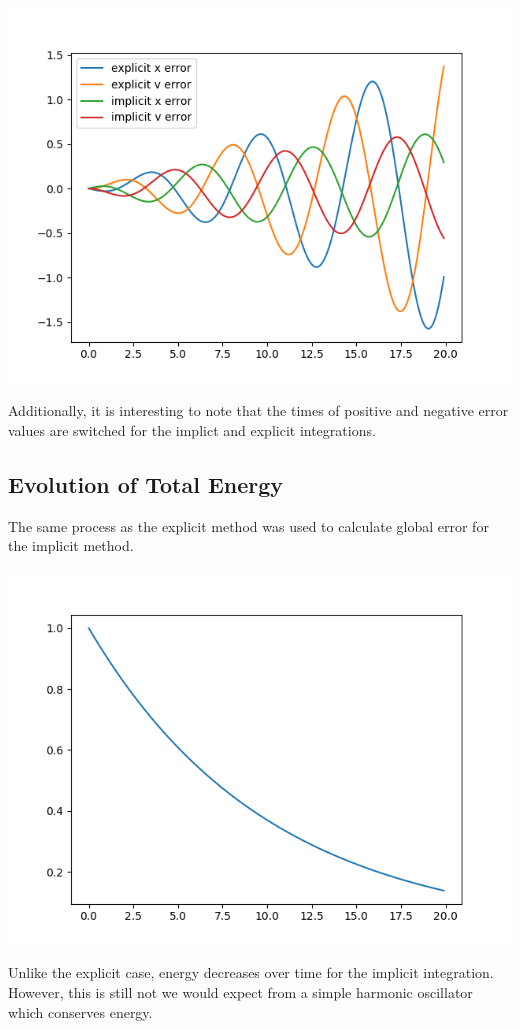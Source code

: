 \documentclass{article}
\begin{document}
\includegraphics[scale=0.9]{images/implicit_vs_explicit_error.png}

Additionally, it is interesting to note that the times of positive and negative error values are switched for the implict and explicit integrations.

\subsection{Evolution of Total Energy}
The same process as the explicit method was used to calculate global error for the implicit method.

\includegraphics[scale=0.9]{images/implicit_energy.png}

Unlike the explicit case, energy decreases over time for the implicit integration. However, this is still not we would expect from a simple harmonic oscillator which conserves energy.
\end{document}
